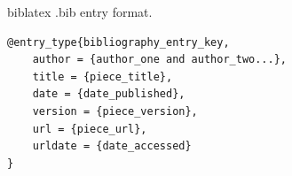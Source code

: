\begin{newsnippet}{biblatex .bib entry format.}
    \begin{verbatim}
@entry_type{bibliography_entry_key,
    author = {author_one and author_two...},
    title = {piece_title},
    date = {date_published},
    version = {piece_version},
    url = {piece_url},
    urldate = {date_accessed}
}
    \end{verbatim}
\end{newsnippet}